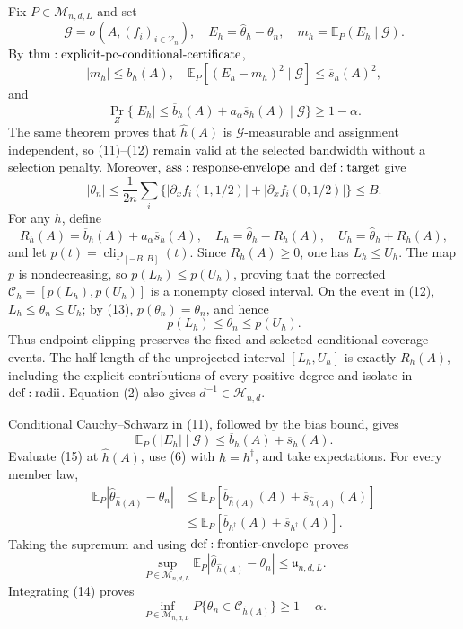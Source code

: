 Fix \(P\in\mathcal M_{n,d,L}\) and set
\[
 \mathcal G=\sigma\!\left(A,(f_i)_{i\in\mathcal V_n}\right),
 \quad E_h=\widehat\theta_h-\theta_n,
 \quad m_h=\mathbb E_P(E_h\mid\mathcal G).
\tag{10}
\]
By \({\rm thm:explicit\text{-}pc\text{-}conditional\text{-}certificate}\),
\[
 |m_h|\leq\overline b_h(A),\quad
 \mathbb E_P[(E_h-m_h)^2\mid\mathcal G]\leq\overline s_h(A)^2,
\tag{11}
\]
and
\[
 \Pr_Z\{|E_h|\leq\overline b_h(A)+a_\alpha\overline s_h(A)\mid\mathcal G\}
 \geq1-\alpha.
\tag{12}
\]
The same theorem proves that \(\widehat h(A)\) is \(\mathcal G\)-measurable and assignment independent, so (11)--(12) remain valid at the selected bandwidth without a selection penalty.  Moreover, \({\rm ass:response\text{-}envelope}\) and \({\rm def:target}\) give
\[
 |\theta_n|\leq\frac1{2n}\sum_i
 \{ |\partial_xf_i(1,1/2)|+|\partial_xf_i(0,1/2)|\}\leq B.
\tag{13}
\]
For any \(h\), define
\[
 R_h(A)=\overline b_h(A)+a_\alpha\overline s_h(A),\quad
 L_h=\widehat\theta_h-R_h(A),\quad U_h=\widehat\theta_h+R_h(A),
\]
and let \(p(t)=\operatorname{clip}_{[-B,B]}(t)\).  Since \(R_h(A)\geq0\), one has \(L_h\leq U_h\).  The map \(p\) is nondecreasing, so \(p(L_h)\leq p(U_h)\), proving that the corrected \(\mathcal C_h=[p(L_h),p(U_h)]\) is a nonempty closed interval.  On the event in (12), \(L_h\leq\theta_n\leq U_h\); by (13), \(p(\theta_n)=\theta_n\), and hence
\[
 p(L_h)\leq\theta_n\leq p(U_h).
\tag{14}
\]
Thus endpoint clipping preserves the fixed and selected conditional coverage events.  The half-length of the unprojected interval \([L_h,U_h]\) is exactly \(R_h(A)\), including the explicit contributions of every positive degree and isolate in \({\rm def:radii}\).  Equation (2) also gives \(d^{-1}\in\mathcal H_{n,d}\).

Conditional Cauchy--Schwarz in (11), followed by the bias bound, gives
\[
 \mathbb E_P(|E_h|\mid\mathcal G)
 \leq\overline b_h(A)+\overline s_h(A).
\tag{15}
\]
Evaluate (15) at \(\widehat h(A)\), use (6) with \(h=h^\dagger\), and take expectations.  For every member law,
\[
\begin{aligned}
 \mathbb E_P|\widehat\theta_{\widehat h(A)}-\theta_n|
 &\leq\mathbb E_P[\overline b_{\widehat h(A)}(A)+\overline s_{\widehat h(A)}(A)]\\
 &\leq\mathbb E_P[\overline b_{h^\dagger}(A)+\overline s_{h^\dagger}(A)].
\end{aligned}
\tag{16}
\]
Taking the supremum and using \({\rm def:frontier\text{-}envelope}\) proves
\[
 \sup_{P\in\mathcal M_{n,d,L}}
 \mathbb E_P|\widehat\theta_{\widehat h(A)}-\theta_n|
 \leq\mathfrak u_{n,d,L}.
\tag{17}
\]
Integrating (14) proves
\[
 \inf_{P\in\mathcal M_{n,d,L}}
 P\{\theta_n\in\mathcal C_{\widehat h(A)}\}\geq1-\alpha.
\tag{18}
\]

